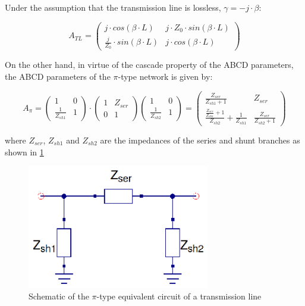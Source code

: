 \noindent Under the assumption that the transmission line is lossless, $\gamma = -j\cdot \beta$:

\begin{equation}
A_{TL} = \begin{pmatrix}
    j\cdot cos(\beta \cdot L)       & j \cdot Z_0 \cdot sin(\beta \cdot L) \\
    \frac{j}{Z_0} \cdot sin(\beta \cdot L) & j \cdot cos(\beta \cdot L)
\end{pmatrix}
\label{eq:ABCD_TL}
\end{equation}

\noindent On the other hand, in virtue of the cascade property of the ABCD parameters, the ABCD parameters of the $\pi$-type network is given by:

\begin{equation}
A_{\pi} = \begin{pmatrix}
     1       & 0 \\
   \frac{1}{Z_{sh1}} & 1
\end{pmatrix} \cdot
\begin{pmatrix}
     1       & Z_{ser} \\
    0 & 1
\end{pmatrix}
\begin{pmatrix}
     1       & 0 \\
    \frac{1}{Z_{sh2}} & 1
\end{pmatrix} = 
\begin{pmatrix}
     \frac{Z_{ser}}{Z_{sh1} + 1}      & Z_{ser} \\
     \frac{\frac{Z_{ser}}{Z_{sh1}}+ 1}{Z_{sh2}} + \frac{1}{Z_{sh1}} & \frac{Z_{ser}}{Z_{sh2} + 1} 
\end{pmatrix}
\label{eq:ABCD_PI}
\end{equation}

\noindent where $Z_{ser}$, $Z_{sh1}$ and $Z_{sh2}$ are the impedances of the series and shunt branches as shown in \ref{fig:Transmission-Line-Circuit-Equivalent-Schematic} 

\begin{figure}[H]
\centering
\includegraphics[width=80mm]{./images/Synthesis/Impedance_Matching/pi-equivalent-circuit}
\caption{Schematic of the $\pi$-type equivalent circuit of a transmission line}
\label{fig:Transmission-Line-Circuit-Equivalent-Schematic}
\end{figure}

